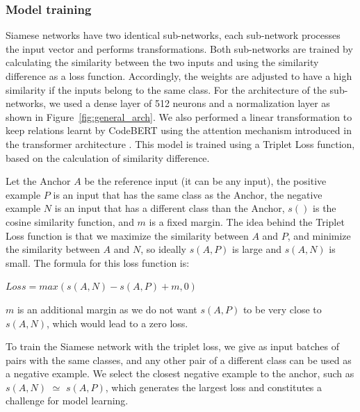 \subsubsection{Model training}


Siamese networks have two identical sub-networks, each sub-network processes the input vector and performs transformations.
Both sub-networks are trained by calculating the similarity between the two inputs and using the similarity difference as a loss function.
Accordingly, the weights are adjusted to have a high similarity if the inputs belong to the same class. For the architecture of the sub-networks, we used a dense layer of 512 neurons and a normalization layer as shown in Figure~\ref{fig:general_arch}.
We also performed a linear transformation to keep relations learnt by CodeBERT using the attention mechanism introduced in the transformer architecture \cite{attention}. 
This model is trained using a Triplet Loss function, based on the calculation of similarity difference.

Let the Anchor $A$ be the reference input (it can be any input), the positive example $P$ is an input that has the same class as the Anchor, the negative example $N$ is an input that has a different class than the Anchor, $s()$ is the cosine similarity function, and $m$ is a fixed margin. The idea behind the Triplet Loss function is that we maximize the similarity between $A$ and $P$, and minimize the similarity between $A$ and $N$, so ideally $s(A, P)$ is large and $s(A, N)$ is small. The formula for this loss function is: 

\vspace{3mm}
\begin{center}
\( Loss = max(s(A, N) - s(A, P) + m, 0) \)
\end{center}
\vspace{3mm}

$m$ is an additional margin as we do not want $s(A, P)$ to be very close to $s(A, N)$, which would lead to a zero loss. 

To train the Siamese network with the triplet loss, we give as input batches of pairs with the same classes, and any other pair of a different class can be used as a negative example. We select the closest negative example to the anchor, such as $s(A,  N)$ $\simeq$ $s(A, P)$, which generates the largest loss and constitutes a challenge for model learning. 